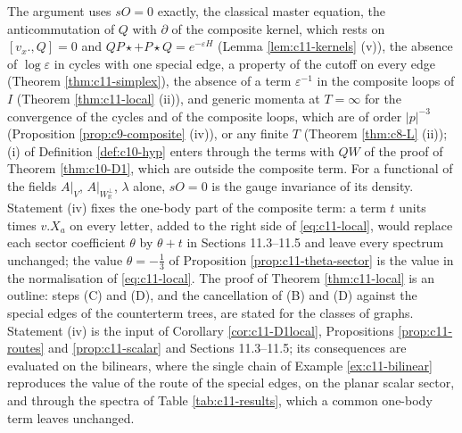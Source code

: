 \begin{remark}
\label{rem:c11-local}
The argument uses $sO=0$ exactly, the classical master equation, the anticommutation of $Q$ with $\partial$ of the composite kernel, which rests on $[v_x.,Q]=0$ and $QP\star+P\star Q=e^{-\varepsilon H}$ (Lemma \ref{lem:c11-kernels} (v)), the absence of $\log\varepsilon$ in cycles with one special edge, a property of the cutoff on every edge (Theorem \ref{thm:c11-simplex}), the absence of a term $\varepsilon^{-1}$ in the composite loops of $I$ (Theorem \ref{thm:c11-local} (ii)), and generic momenta at $T=\infty$ for the convergence of the cycles and of the composite loops, which are of order $|p|^{-3}$ (Proposition \ref{prop:c9-composite} (iv)), or any finite $T$ (Theorem \ref{thm:c8-L} (ii)); (i) of Definition \ref{def:c10-hyp} enters through the terms with $QW$ of the proof of Theorem \ref{thm:c10-D1}, which are outside the composite term. For a functional of the fields $A|_V$, $A|_{W_{\mathbb R}^\perp}$, $\lambda$ alone, $sO=0$ is the gauge invariance of its density. Statement (iv) fixes the one-body part of the composite term: a term $t$ units times $v.X_a$ on every letter, added to the right side of \eqref{eq:c11-local}, would replace each sector coefficient $\theta$ by $\theta+t$ in Sections 11.3--11.5 and leave every spectrum unchanged; the value $\theta=-\tfrac13$ of Proposition \ref{prop:c11-theta-sector} is the value in the normalisation of \eqref{eq:c11-local}. The proof of Theorem \ref{thm:c11-local} is an outline: steps (C) and (D), and the cancellation of (B) and (D) against the special edges of the counterterm trees, are stated for the classes of graphs. Statement (iv) is the input of Corollary \ref{cor:c11-D1local}, Propositions \ref{prop:c11-routes} and \ref{prop:c11-scalar} and Sections 11.3--11.5; its consequences are evaluated on the bilinears, where the single chain of Example \ref{ex:c11-bilinear} reproduces the value of the route of the special edges, on the planar scalar sector, and through the spectra of Table \ref{tab:c11-results}, which a common one-body term leaves unchanged.
\end{remark}

